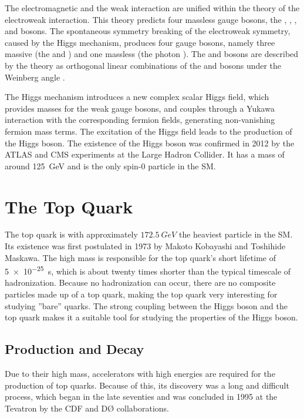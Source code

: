The electromagnetic and the weak interaction are unified within the theory of the electroweak interaction. This theory predicts four massless gauge bosons, the \PBzero, \PWone, \PWtwo, and \PWthree bosons. The spontaneous symmetry breaking of the electroweak symmetry, caused by the Higgs mechanism, produces four gauge bosons, namely three massive (the \PZzero and \PWpm) and one massless (the photon \Pphoton). The \PZzero and \PWpm bosons are described by the theory as orthogonal linear combinations of the \PBzero and \PWone bosons under the Weinberg angle \cite{wiki:electroweak}.

The Higgs mechanism introduces a new complex scalar Higgs field, which provides masses for the weak gauge bosons, and couples through a Yukawa interaction with the corresponding fermion fields, generating non-vanishing fermion mass terms. The excitation of the Higgs field leads to the production of the Higgs boson. The existence of the Higgs boson was confirmed in 2012 by the ATLAS and CMS experiments at the Large Hadron Collider. It has a mass of around \SI{125}{\giga\eV} \cite{Cha12} and is the only spin-0 particle in the SM.

\section{The Top Quark}
\label{sec:theory_top}
The top quark is with approximately $\SI{172.5}{GeV}$ \cite{ACCC14} the heaviest particle in the SM. Its existence was first postulated in 1973 by Makoto Kobayashi and Toshihide Maskawa. The high mass is responsible for the top quark's short lifetime of \SI{5e-25}{s}, which is about twenty times shorter than the typical timescale of hadronization. Because no hadronization can occur, there are no composite particles made up of a top quark, making the top quark very interesting for studying ''bare'' quarks. The strong coupling between the Higgs boson and the top quark makes it a suitable tool for studying the properties of the Higgs boson.

\subsection{Production and Decay}
Due to their high mass, accelerators with high energies are required for the production of top quarks. Because of this, its discovery was a long and difficult process, which began in the late seventies \cite{RevModPhys.69.137} and was concluded in 1995 at the Tevatron by the CDF and D\O{} collaborations.

